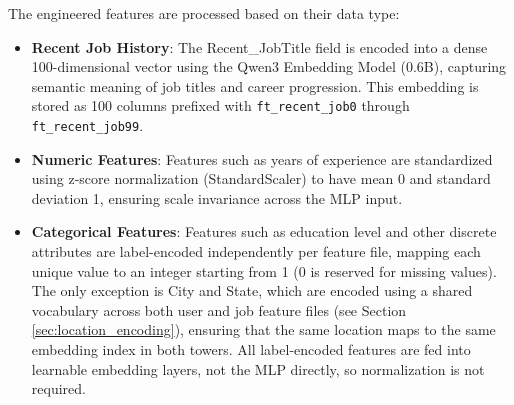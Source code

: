 The engineered features are processed based on their data type:

\begin{itemize}
    \item \textbf{Recent Job History}: The Recent\_JobTitle field is encoded into a dense 100-dimensional vector using the Qwen3 Embedding Model (0.6B), capturing semantic meaning of job titles and career progression. This embedding is stored as 100 columns prefixed with \texttt{ft\_recent\_job0} through \texttt{ft\_recent\_job99}.
    \item \textbf{Numeric Features}: Features such as years of experience are standardized using z-score normalization (StandardScaler) to have mean 0 and standard deviation 1, ensuring scale invariance across the \gls{MLP} input.
    \item \textbf{Categorical Features}: Features such as education level and other discrete attributes are label-encoded independently per feature file, mapping each unique value to an integer starting from 1 (0 is reserved for missing values). The only exception is City and State, which are encoded using a shared vocabulary across both user and job feature files (see Section \ref{sec:location_encoding}), ensuring that the same location maps to the same embedding index in both towers. All label-encoded features are fed into learnable embedding layers, not the \gls{MLP} 
    directly, so normalization is not required.
\end{itemize}

